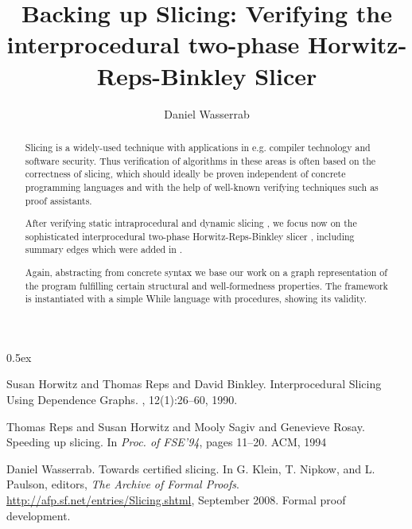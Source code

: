 \documentclass[11pt,a4paper,notitlepage]{report}
\begin{document}
\title{Backing up Slicing: Verifying the interprocedural two-phase Horwitz-Reps-Binkley Slicer}
\author{Daniel Wasserrab}
\maketitle

\begin{abstract}
Slicing is a widely-used technique with applications in e.g. compiler
technology and software security. Thus verification of
algorithms in these areas is often based on the correctness of slicing,
which should ideally be proven independent of concrete programming
languages and with the help of well-known verifying techniques such as
proof assistants. 

After verifying static intraprocedural and dynamic slicing \cite{Wasserrab:08}, we
focus now on the sophisticated interprocedural two-phase Horwitz-Reps-Binkley slicer
\cite{HorwitzRB:88}, including summary edges which were added in \cite{RepsHSR:94}.

Again, abstracting from concrete syntax we base our work on a graph
representation of the program fulfilling certain structural
and well-formedness properties. The framework is instantiated with a simple 
While language with procedures, showing its validity.
\end{abstract}

\parindent 0pt\parskip 0.5ex



%
%
\begin{thebibliography}{10}

Susan Horwitz and Thomas Reps and David Binkley.
\newblock Interprocedural Slicing Using Dependence Graphs.
, 12(1):26--60, 1990.

Thomas Reps and Susan Horwitz and Mooly Sagiv and Genevieve Rosay.
\newblock Speeding up slicing.
\newblock In {\em Proc. of FSE'94}, pages 11--20. ACM, 1994

\newblock Daniel Wasserrab.
\newblock Towards certified slicing.
\newblock In G. Klein, T. Nipkow, and L. Paulson, editors, {\em The Archive of Formal
Proofs}.
\newblock \url{http://afp.sf.net/entries/Slicing.shtml}, September 2008.
\newblock Formal proof development.

\end{thebibliography}
\end{document}
